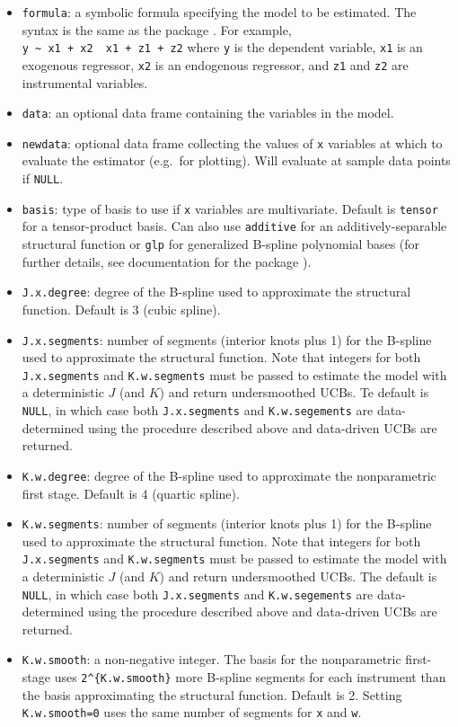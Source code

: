 \documentclass[
]{jss}
\begin{document}
\begin{itemize}
\item
  \texttt{formula}: a symbolic formula specifying the model to be
  estimated. The syntax is the same as the package 
  \citep{IVREG}. For example,
  \texttt{y\ \textasciitilde{}\ x1\ +\ x2\ \textbar{}\ x1\ +\ z1\ +\ z2}
  where \texttt{y} is the dependent variable, \texttt{x1} is an
  exogenous regressor, \texttt{x2} is an endogenous regressor, and
  \texttt{z1} and \texttt{z2} are instrumental variables.
\item
  \texttt{data}: an optional data frame containing the variables in the
  model.
\item
  \texttt{newdata}: optional data frame collecting the values of
  \texttt{x} variables at which to evaluate the estimator (e.g.~for
  plotting). Will evaluate at sample data points if \texttt{NULL}.
\item
  \texttt{basis}: type of basis to use if \texttt{x} variables are
  multivariate. Default is \texttt{tensor} for a tensor-product basis.
  Can also use \texttt{additive} for an additively-separable structural
  function or \texttt{glp} for generalized B-spline polynomial bases
  (for further details, see documentation for the package 
  \citep{CRS}).
\item
  \texttt{J.x.degree}: degree of the B-spline used to approximate the
  structural function. Default is 3 (cubic spline).
\item
  \texttt{J.x.segments}: number of segments (interior knots plus 1) for
  the B-spline used to approximate the structural function. Note that
  integers for both \texttt{J.x.segments} and \texttt{K.w.segments} must
  be passed to estimate the model with a deterministic \(J\) (and \(K\))
  and return undersmoothed UCBs. Te default is \texttt{NULL}, in which
  case both \texttt{J.x.segments} and \texttt{K.w.segements} are
  data-determined using the procedure described above and data-driven
  UCBs are returned.
\item
  \texttt{K.w.degree}: degree of the B-spline used to approximate the
  nonparametric first stage. Default is 4 (quartic spline).
\item
  \texttt{K.w.segments}: number of segments (interior knots plus 1) for
  the B-spline used to approximate the structural function. Note that
  integers for both \texttt{J.x.segments} and \texttt{K.w.segments} must
  be passed to estimate the model with a deterministic \(J\) (and \(K\))
  and return undersmoothed UCBs. The default is \texttt{NULL}, in which
  case both \texttt{J.x.segments} and \texttt{K.w.segements} are
  data-determined using the procedure described above and data-driven
  UCBs are returned.
\item
  \texttt{K.w.smooth}: a non-negative integer. The basis for the
  nonparametric first-stage uses \texttt{2\^{}\{K.w.smooth\}} more
  B-spline segments for each instrument than the basis approximating the
  structural function. Default is 2. Setting \texttt{K.w.smooth=0} uses
  the same number of segments for \texttt{x} and \texttt{w}.
\end{itemize}
\end{document}

